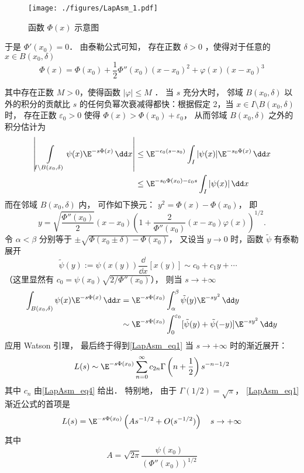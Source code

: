 \begin{figure}[ht]
\centering
\texttt{[image: ./figures/LapAsm\_1.pdf]}
\caption{函数 $\Phi(x)$ 示意图} \label{LapAsm_fig1}
\end{figure}

于是 $\Phi'(x_0)=0$． 由泰勒公式可知， 存在正数 $\delta>0$ ，使得对于任意的 $x\in B(x_0,\delta)$  
\[
  \Phi(x)=\Phi(x_0)+\frac{1}{2}\Phi''(x_0)(x-x_0)^2+\varphi(x)(x-x_0)^3
\]

其中存在正数 $M>0$，使得函数 $|\varphi|\leq M$ ． 当 $s$ 充分大时， 邻域 $B(x_0,\delta)$ 以外的积分的贡献比 $s$ 的任何负幂次衰减得都快：根据假定 2，当 $x\in I\setminus B(x_0,\delta)$ 时， 存在正数 $\varepsilon_0>0$ 使得 $\Phi(x)>\Phi(x_0)+\varepsilon_0$， 从而邻域 $B(x_0,\delta)$ 之外的积分估计为
\begin{align*}
    \left|\int\limits_{I\setminus B(x_0,\delta)}\psi(x)\E^{-s\Phi(x)}\,\dd x\right|
    &\leq \E^{-\epsilon_0(s-s_0)}\int_I|\psi(x)|\E^{-s_0\Phi(x)}\,\dd x\nonumber\\
    &\leq \E^{-s_0\Phi(x_0)-\varepsilon_0s}\int_{I}|\psi(x)|\,\dd x\nonumber
\end{align*}
而在邻域 $B(x_0,\delta)$ 内， 可作如下换元： $y^2=\Phi(x)-\Phi(x_0)$， 即
\[
  y=\sqrt{\frac{\Phi''(x_0)}{2}}(x-x_0)\left(1+\frac{2}{\Phi''(x_0)}(x-x_0)\varphi(x)\right)^{1/2}.
\]
令 $\alpha<\beta$ 分别等于 $\pm\sqrt{\Phi(x_0\pm\delta)-\Phi(x_0)}$， 又设当 $y\to0$ 时，函数 $\tilde{\psi}$ 有泰勒展开
\begin{equation}\label{LapAsm_eq4}
\tilde{\psi}(y):=\psi(x(y))\frac{\dd}{\dd x}[x(y)]\sim c_0+c_1y+\cdots \quad 
\end{equation}
（这里显然有 $c_0=\psi(x_0)\sqrt{2/\Phi''(x_0)}$）， 则当 $s\to+\infty$
$$
\begin{aligned}
\int_{B(x_0,\delta)}\psi(x)\E^{-s\Phi(x)}\,\dd x
&=\E^{-s\Phi(x_0)}\int_{\alpha}^{\beta}\tilde \psi(y)\E^{-sy^2}\,\dd y\\
&\sim\E^{-s\Phi(x_0)}\int_{0}^{\varepsilon_0}[\tilde \psi(y)+\tilde \psi(-y)]\E^{-sy^2}\,\dd y
\end{aligned}
$$
应用 Watson 引理， 最后终于得到\autoref{LapAsm_eq1} 当 $s\to+\infty$ 时的渐近展开：
\begin{equation}\label{LapAsm_eq5}
  L(s)\sim \E^{-s\Phi(x_0)}\sum_{n=0}^\infty c_{2n}\Gamma\left(n+\frac{1}{2}\right)s^{-n-1/2}
\end{equation}
其中 $c_n$ 由\autoref{LapAsm_eq4} 给出． 特别地， 由于 $\Gamma(1/2)=\sqrt{\pi}$， \autoref{LapAsm_eq1} 渐近公式的首项是
\[
L(s)=\E^{-s\Phi(x_0)}\left(As^{-1/2}+O(s^{-1/2})\right)\quad s\to+\infty
\]
其中
\[
  A=\sqrt{2\pi}\frac{\psi(x_0)}{(\Phi''(x_0))^{1/2}}
\]

